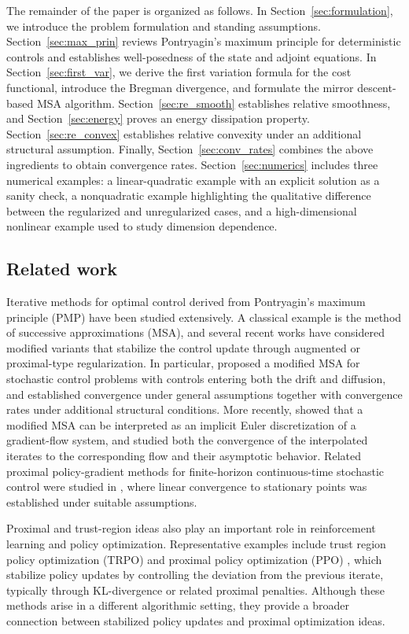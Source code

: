 \documentclass[11pt]{amsart}
\theoremstyle{plain}
\theoremstyle{definition}
\theoremstyle{remark}
\begin{document}
The remainder of the paper is organized as follows. In Section~\ref{sec:formulation}, we introduce the problem formulation and standing assumptions. Section~\ref{sec:max_prin} reviews Pontryagin’s maximum principle for deterministic controls and establishes well-posedness of the state and adjoint equations. In Section~\ref{sec:first_var}, we derive the first variation formula for the cost functional, introduce the Bregman divergence, and formulate the mirror descent-based MSA algorithm. Section~\ref{sec:re_smooth} establishes relative smoothness, and Section~\ref{sec:energy} proves an energy dissipation property. Section~\ref{sec:re_convex} establishes relative convexity under an additional structural assumption. Finally, Section~\ref{sec:conv_rates} combines the above ingredients to obtain convergence rates. Section~\ref{sec:numerics} includes three numerical examples: a linear-quadratic example with an explicit solution as a sanity check, a nonquadratic example highlighting the qualitative difference between the regularized and unregularized cases, and a high-dimensional nonlinear example used to study dimension dependence.

\subsection*{Related work}

Iterative methods for optimal control derived from Pontryagin's maximum principle (PMP) have been studied extensively. A classical example is the method of successive approximations (MSA), and several recent works have considered modified variants that stabilize the control update through augmented or proximal-type regularization. In particular, \cite{kerimkulov2021modified} proposed a modified MSA for stochastic control problems with controls entering both the drift and diffusion, and established convergence under general assumptions together with convergence rates under additional structural conditions. More recently, \cite{sethi2024modified} showed that a modified MSA can be interpreted as an implicit Euler discretization of a gradient-flow system, and studied both the convergence of the interpolated iterates to the corresponding flow and their asymptotic behavior. Related proximal policy-gradient methods for finite-horizon continuous-time stochastic control were studied in \cite{reisinger2023linear}, where linear convergence to stationary points was established under suitable assumptions.

Proximal and trust-region ideas also play an important role in reinforcement learning and policy optimization. Representative examples include trust region policy optimization (TRPO) \cite{schulman2015trust} and proximal policy optimization (PPO) \cite{schulman2017proximal}, which stabilize policy updates by controlling the deviation from the previous iterate, typically through KL-divergence or related proximal penalties. Although these methods arise in a different algorithmic setting, they provide a broader connection between stabilized policy updates and proximal optimization ideas.
\end{document}
